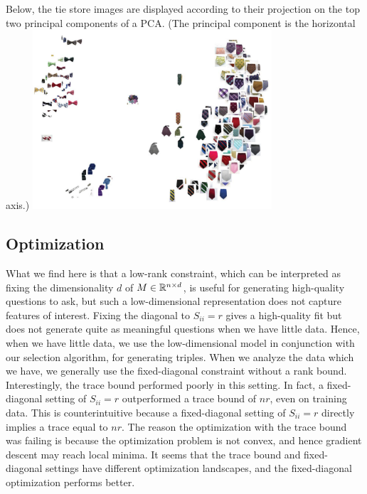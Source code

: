\documentclass{article}
\begin{document}
Below, the tie store images are displayed according to their projection on the top two principal components of a PCA.  (The principal component is the horizontal axis.)
{\center \includegraphics[width=3.5in]{neckties_pca2.pdf}}



\subsection{Optimization}


What we find here is that a low-rank constraint, which can be interpreted as fixing the dimensionality $d$ of $M \in \mathbb{R}^{n \times d}$, is useful for generating high-quality questions to ask, but such a low-dimensional representation does not capture features of interest.  Fixing the diagonal to $S_{ii}=r$ gives a high-quality fit but does not generate quite as meaningful questions when we have little data.  Hence, when we have little data, we use the low-dimensional model in conjunction with our selection algorithm, for generating triples.  When we analyze the data which we have, we generally use the fixed-diagonal constraint without a rank bound.  Interestingly, the trace bound performed poorly in this setting.  In fact, a fixed-diagonal setting of $S_{ii}=r$ outperformed a trace bound of $nr$, even on training data.  This is counterintuitive because a fixed-diagonal setting of $S_{ii}=r$ directly implies a trace equal to $nr$.  The reason the optimization with the trace bound was failing is because the optimization problem is not convex, and hence gradient descent may reach local minima.  It seems that the trace bound and fixed-diagonal settings have different optimization landscapes, and the fixed-diagonal optimization performs better.
\end{document}
